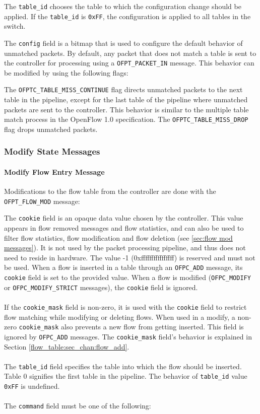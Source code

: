 
The \verb|table_id| chooses the table to which the configuration change should be applied. If the \verb|table_id| is \verb|0xFF|, the configuration is applied to all tables in the switch.

The \verb|config| field is a bitmap that is used to configure the default behavior of unmatched packets.  By default, any packet that does not match a table is sent to the controller for processing using a \verb|OFPT_PACKET_IN| message.  This behavior can be modified by using the following flags:


The \verb|OFPTC_TABLE_MISS_CONTINUE| flag directs unmatched packets to the next table in the pipeline, except for the last table of the pipeline where unmatched packets are sent to the controller.  This behavior is similar to the multiple table match process in the OpenFlow 1.0 specification. The \verb|OFPTC_TABLE_MISS_DROP| flag drops unmatched packets.

\subsubsection{Modify State Messages}
\paragraph{Modify Flow Entry Message}
Modifications to the flow table from the controller are done with the \verb|OFPT_FLOW_MOD| message:


The \verb|cookie| field is an opaque data value chosen by the controller.  This value appears in flow removed messages and flow statistics, and can also be used to filter flow statistics, flow modification and flow deletion (see \ref{sec:flow mod messages}). It is not used by the packet processing pipeline, and thus does not need to reside in hardware.  The value -1 (0xffffffffffffffff) is reserved and must not be used. When a flow is inserted in a table through an \verb|OFPC_ADD| message, its \verb|cookie| field is set to the provided value. When a flow is modified (\verb|OFPC_MODIFY| or \verb|OFPC_MODIFY_STRICT| messages), the \verb|cookie| field is ignored.
\\\\
If the \verb|cookie_mask| field is non-zero, it is used with the \verb|cookie| field to restrict flow matching while modifying or deleting flows.  When used in a modify, a non-zero \verb|cookie_mask| also prevents a new flow from getting inserted. This field is ignored by \verb|OFPC_ADD| messages. The \verb|cookie_mask| field's behavior is explained in Section \ref{flow_table:sec_chan:flow_add}.
\\\\
The \verb|table_id| field specifies the table into which the flow should be inserted.
Table 0 signifies the first table in the pipeline. The behavior of \verb|table_id| value \verb|0xFF| is undefined.
\\\\
The \verb|command| field must be one of the following:

